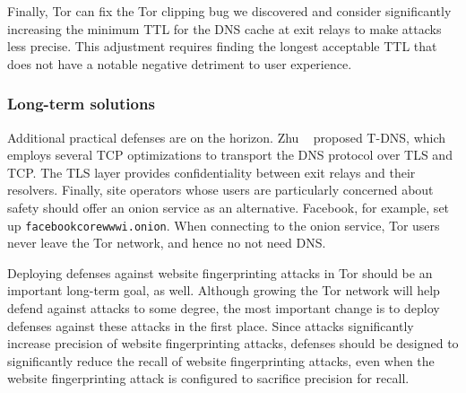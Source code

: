Finally, Tor can fix the Tor clipping bug we discovered and consider
significantly increasing the minimum TTL for the DNS cache at exit relays to
make \name attacks less precise.  This adjustment requires finding the longest
acceptable TTL that does not have a notable negative detriment to user
experience.

\subsubsection{Long-term solutions}
\label{sec:long-term}

Additional practical defenses are on the horizon.  Zhu \ea~\cite{Zhu2015a}
proposed T-DNS, which employs several TCP optimizations to transport the DNS
protocol over TLS and TCP.  The TLS layer provides confidentiality between exit
relays and their resolvers.  Finally, site operators whose users are
particularly concerned about safety should offer an onion service as an
alternative.  Facebook, for example, set up {\tt facebookcorewwwi.onion}.  When
connecting to the onion service, Tor users never leave the Tor network, and
hence no not need DNS.

Deploying defenses against website fingerprinting attacks in Tor should be an
important long-term goal, as well.
Although growing the Tor network will help defend against \name attacks to some
degree, the most important change is to
deploy defenses against these attacks in the first place.  Since \name attacks
significantly increase precision of website fingerprinting attacks, defenses
should be designed to significantly reduce the recall of website fingerprinting
attacks, even when the website fingerprinting attack is configured to sacrifice
precision for recall.
